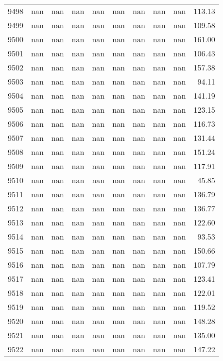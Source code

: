 \begin{tabular}{lrrrrrrrrr}
9498 & nan & nan & nan & nan & nan & nan & nan & nan & 113.13 \\
9499 & nan & nan & nan & nan & nan & nan & nan & nan & 109.58 \\
9500 & nan & nan & nan & nan & nan & nan & nan & nan & 161.00 \\
9501 & nan & nan & nan & nan & nan & nan & nan & nan & 106.43 \\
9502 & nan & nan & nan & nan & nan & nan & nan & nan & 157.38 \\
9503 & nan & nan & nan & nan & nan & nan & nan & nan & 94.11 \\
9504 & nan & nan & nan & nan & nan & nan & nan & nan & 141.19 \\
9505 & nan & nan & nan & nan & nan & nan & nan & nan & 123.15 \\
9506 & nan & nan & nan & nan & nan & nan & nan & nan & 116.73 \\
9507 & nan & nan & nan & nan & nan & nan & nan & nan & 131.44 \\
9508 & nan & nan & nan & nan & nan & nan & nan & nan & 151.24 \\
9509 & nan & nan & nan & nan & nan & nan & nan & nan & 117.91 \\
9510 & nan & nan & nan & nan & nan & nan & nan & nan & 45.85 \\
9511 & nan & nan & nan & nan & nan & nan & nan & nan & 136.79 \\
9512 & nan & nan & nan & nan & nan & nan & nan & nan & 136.77 \\
9513 & nan & nan & nan & nan & nan & nan & nan & nan & 122.60 \\
9514 & nan & nan & nan & nan & nan & nan & nan & nan & 93.53 \\
9515 & nan & nan & nan & nan & nan & nan & nan & nan & 150.66 \\
9516 & nan & nan & nan & nan & nan & nan & nan & nan & 107.79 \\
9517 & nan & nan & nan & nan & nan & nan & nan & nan & 123.41 \\
9518 & nan & nan & nan & nan & nan & nan & nan & nan & 122.01 \\
9519 & nan & nan & nan & nan & nan & nan & nan & nan & 119.52 \\
9520 & nan & nan & nan & nan & nan & nan & nan & nan & 148.28 \\
9521 & nan & nan & nan & nan & nan & nan & nan & nan & 135.00 \\
9522 & nan & nan & nan & nan & nan & nan & nan & nan & 147.22 \\

\end{tabular}
